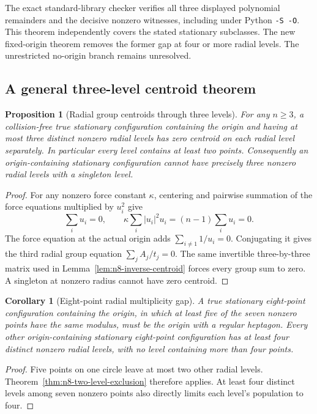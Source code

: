 \documentclass[11pt]{article}
\newtheorem{proposition}[theorem]{Proposition}
\newtheorem{corollary}[theorem]{Corollary}
\theoremstyle{remark}
\numberwithin{equation}{section}
\begin{document}
The exact standard-library checker 
verifies all three displayed polynomial remainders and the decisive
nonzero witnesses, including under Python \texttt{-S -O}.
This theorem independently covers the stated stationary subclasses.
The new fixed-origin theorem removes the former gap at four or more
radial levels. The unrestricted no-origin branch remains unresolved.


\subsection{A general three-level centroid theorem}

\begin{proposition}[Radial group centroids through three levels]
\label{prop:three-level-centroids-general}
For any $n\ge3$, a collision-free true stationary configuration
containing the origin and having at most three distinct nonzero
radial levels has zero centroid on each radial level separately.
In particular every level contains at least two points. Consequently
an origin-containing stationary configuration cannot have precisely
three nonzero radial levels with a singleton level.
\end{proposition}
\begin{proof}
For any nonzero force constant $\kappa$, centering and pairwise
summation of the force equations multiplied by $u_i^2$ give
\[
 \sum_i u_i=0,\qquad
 \kappa\sum_i |u_i|^2u_i=(n-1)\sum_i u_i=0.
\]
The force equation at the actual origin adds $\sum_{i\ne1}1/u_i=0$.
Conjugating it gives the third radial group equation
$\sum_j A_j/t_j=0$. The same invertible three-by-three matrix used
in Lemma~\ref{lem:n8-inverse-centroid} forces every group sum to zero.
A singleton at nonzero radius cannot have zero centroid.
\end{proof}

\begin{corollary}[Eight-point radial multiplicity gap]
\label{cor:n8-five-equal-radii}
A true stationary eight-point configuration containing the origin,
in which at least five of the seven nonzero points have the same
modulus, must be the origin with a regular heptagon. Every other
origin-containing stationary eight-point configuration has at least
four distinct nonzero radial levels, with no level containing more
than four points.
\end{corollary}
\begin{proof}
Five points on one circle leave at most two other radial levels.
Theorem~\ref{thm:n8-two-level-exclusion} therefore applies. At least
four distinct levels among seven nonzero points also directly limits
each level's population to four.
\end{proof}
\end{document}
